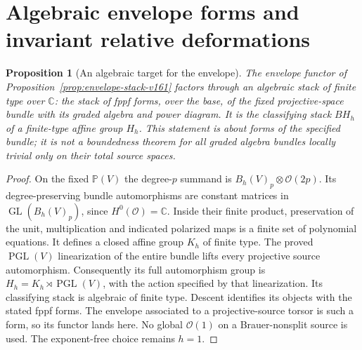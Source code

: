 \documentclass[11pt,reqno]{amsart}
\numberwithin{equation}{section}
\newtheorem{proposition}[theorem]{Proposition}
\theoremstyle{definition}\newtheorem{definition}[theorem]{Definition}
\theoremstyle{remark}\newtheorem{remark}[theorem]{Remark}
\newcommand{\C}{\mathbb C}\newcommand{\Q}{\mathbb Q}
\newcommand{\Pj}{\mathbb P}\newcommand{\A}{\mathbb A}
\newcommand{\OO}{\mathcal O}\newcommand{\II}{\mathcal I}
\begin{document}
\section{Algebraic envelope forms and invariant relative deformations}
\label{sec:invariant-deformations-v162}
\begin{proposition}[An algebraic target for the envelope]
\label{prop:algebraic-envelope-v162}
The envelope functor of Proposition~\ref{prop:envelope-stack-v161}
factors through an algebraic stack of finite type over $\C$: the
stack of fppf forms, over the base, of the fixed projective-space
bundle with its graded algebra and power diagram. It is the classifying
stack $BH_h$ of a finite-type affine group $H_h$. This statement is
about forms of the specified bundle; it is not a boundedness theorem
for all graded algebra bundles locally trivial only on their total
source spaces.
\end{proposition}
\begin{proof}
On the fixed $\Pj(V)$ the degree-$p$ summand is
$B_h(V)_p\otimes\OO(2p)$. Its degree-preserving bundle automorphisms
are constant matrices in $\operatorname{GL}(B_h(V)_p)$, since
$H^0(\OO)=\C$. Inside their finite product, preservation of the unit,
multiplication and indicated polarized maps is a finite set of
polynomial equations. It defines a closed affine group $K_h$ of
finite type. The proved $\operatorname{PGL}(V)$ linearization of
the entire bundle lifts every projective source automorphism.
Consequently its full automorphism group is
$H_h=K_h\rtimes\operatorname{PGL}(V)$, with the action specified by
that linearization. Its classifying stack is algebraic of finite
type. Descent identifies its objects with the stated fppf forms.
The envelope associated to a projective-source torsor is such a form,
so its functor lands here. No global $\OO(1)$ on a Brauer-nonsplit
source is used. The exponent-free choice remains $h=1$.
\end{proof}
\end{document}
